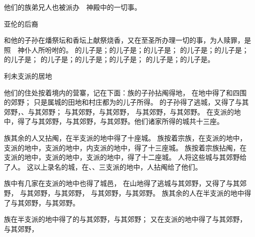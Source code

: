 {他们的族弟兄{}人也被派办　神殿中的一切事。
\par }{\SH 亚伦的后裔
\par }{\PP {}和他的子孙在燔祭坛和香坛上献祭烧香，又在至圣所办理一切的事，为{}人赎罪，是照　神仆人{}所吩咐的。
的儿子是{}；{}的儿子是{}；{}的儿子是{}；
的儿子是{}；{}的儿子是{}；{}的儿子是{}；
的儿子是{}；{}的儿子是{}；{}的儿子是{}；
的儿子是{}；{}的儿子是{}。
\par }{\SH 利未支派的居地
\par }{\PP {}他们的住处按着境内的营寨，记在下面：{}族{}的子孙{}拈阄得地，
在{}地中得了{}和四围的郊野；
只是属城的田地和村庄都为{}的儿子{}所得。
的子孙得了逃城{}，又得了{}与其郊野，{}、{}与其郊野；
与其郊野，{}与其郊野，
与其郊野，{}与其郊野。
在{}支派的地中，得了{}与其郊野，{}与其郊野，{}与其郊野。他们诸家所得的城共十三座。
\par }{\PP {}族其余的人又拈阄，在{}半支派的地中得了十座城。
族按着宗族，在{}支派的地中，{}支派的地中，{}支派的地中，{}内{}支派的地中，得了十三座城。
族按着宗族拈阄，在{}支派的地中，{}支派的地中，{}支派的地中，得了十二座城。
人将这些城与其郊野给了{}人。
这以上录名的城，在{}、{}、{}三支派的地中，{}人拈阄给了他们。
\par }{\PP {}族中有几家在{}支派的地中也得了城邑，
在{}山地得了逃城{}与其郊野，又得了{}与其郊野，
与其郊野，{}与其郊野，
与其郊野，{}与其郊野。
族其余的人在{}半支派的地中得了{}与其郊野，{}与其郊野。
\par }{\PP {}族在{}半支派的地中得了{}的{}与其郊野，{}与其郊野；
又在{}支派的地中得了{}与其郊野，{}与其郊野，
}

